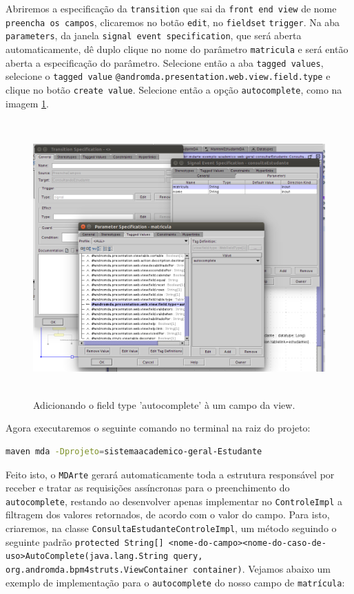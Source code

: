 Abriremos a especificação da \texttt{transition} que sai da \texttt{front end
view} de nome \texttt{preencha os campos}, clicaremos no botão \texttt{edit}, no
\texttt{fieldset} \texttt{trigger}. Na aba \texttt{parameters}, da janela
\texttt{signal event specification}, que será aberta automaticamente, dê duplo
clique no nome do parâmetro \texttt{matricula} e será então aberta a
especificação do parâmetro. Selecione então a aba \texttt{tagged values},
selecione o \texttt{tagged value}
\texttt{@andromda.presentation.web.view.field.type} e clique no botão
\texttt{create value}. Selecione então a opção \texttt{autocomplete}, como na
imagem \ref{field_type_autocomplete}.
\begin{figure}[H]
	\centering
	\includegraphics[width=350pt,height=300pt]{imgs/tutorial-mdarte-0027.png}
	\caption{Adicionando o field type 'autocomplete' à um campo da view.}
	\label{field_type_autocomplete}
\end{figure}

Agora executaremos o seguinte comando no terminal na raiz do projeto:
\begin{lstlisting}[language=bash]
maven mda -Dprojeto=sistemaacademico-geral-Estudante
\end{lstlisting}

Feito isto, o \texttt{MDArte} gerará automaticamente toda a estrutura
responsável por receber e tratar as requisições assíncronas para o preenchimento do
\texttt{autocomplete}, restando ao desenvolver apenas implementar no
\texttt{ControleImpl} a filtragem dos valores retornados, de acordo com o valor
do campo. Para isto, criaremos, na classe
\texttt{ConsultaEstudanteControleImpl}, um método seguindo o seguinte padrão 
\texttt{protected String[]
<nome-do-campo><nome-do-caso-de-uso>AutoComplete(java.lang.String query,
org.andromda.bpm4struts.ViewContainer container)}. Vejamos abaixo um exemplo de
implementação para o \texttt{autocomplete} do nosso campo de \texttt{matrícula}:

